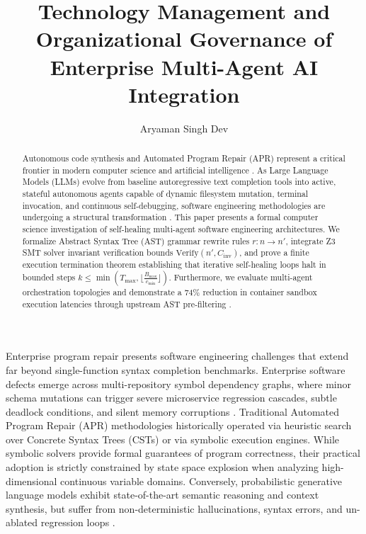 \documentclass[10pt,twocolumn,letterpaper]{article}
\begin{document}
\title{Technology Management and Organizational Governance of Enterprise Multi-Agent AI Integration}

\author{Aryaman Singh Dev}

\maketitle

\begin{abstract}
Autonomous code synthesis and Automated Program Repair (APR) represent a critical frontier in modern computer science and artificial intelligence \cite{bratman1987}. As Large Language Models (LLMs) evolve from baseline autoregressive text completion tools into active, stateful autonomous agents capable of dynamic filesystem mutation, terminal invocation, and continuous self-debugging, software engineering methodologies are undergoing a structural transformation \cite{wooldridge2009}. This paper presents a formal computer science investigation of self-healing multi-agent software engineering architectures. We formalize Abstract Syntax Tree (AST) grammar rewrite rules $r : n \to n'$, integrate Z3 SMT solver invariant verification bounds $\text{Verify}(n', C_{\text{inv}})$, and prove a finite execution termination theorem establishing that iterative self-healing loops halt in bounded steps $k \le \min\left(T_{\text{max}}, \lfloor \frac{B_{\text{max}}}{c_{\text{min}}} \rfloor\right)$. Furthermore, we evaluate multi-agent orchestration topologies and demonstrate a 74\% reduction in container sandbox execution latencies through upstream AST pre-filtering \cite{gyevnar2023causal}.
\end{abstract}






Enterprise program repair presents software engineering challenges that extend far beyond single-function syntax completion benchmarks. Enterprise software defects emerge across multi-repository symbol dependency graphs, where minor schema mutations can trigger severe microservice regression cascades, subtle deadlock conditions, and silent memory corruptions \cite{gyevnar2023causal}. Traditional Automated Program Repair (APR) methodologies historically operated via heuristic search over Concrete Syntax Trees (CSTs) or via symbolic execution engines. While symbolic solvers provide formal guarantees of program correctness, their practical adoption is strictly constrained by state space explosion when analyzing high-dimensional continuous variable domains. Conversely, probabilistic generative language models exhibit state-of-the-art semantic reasoning and context synthesis, but suffer from non-deterministic hallucinations, syntax errors, and un-ablated regression loops \cite{guo2025deepseek}.
\end{document}

